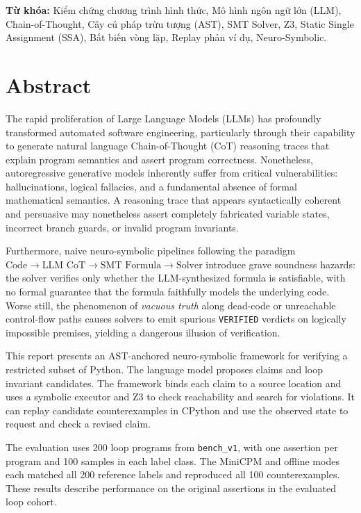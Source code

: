 \vspace{0.5cm}
\noindent\textbf{Từ khóa:} Kiểm chứng chương trình hình thức, Mô hình ngôn ngữ lớn (LLM), Chain-of-Thought, Cây cú pháp trừu tượng (AST), SMT Solver, Z3, Static Single Assignment (SSA), Bất biến vòng lặp, Replay phản ví dụ, Neuro-Symbolic.

\chapter*{Abstract}
The rapid proliferation of Large Language Models (LLMs) has profoundly transformed automated software engineering, particularly through their capability to generate natural language Chain-of-Thought (CoT) reasoning traces that explain program semantics and assert program correctness. Nonetheless, autoregressive generative models inherently suffer from critical vulnerabilities: hallucinations, logical fallacies, and a fundamental absence of formal mathematical semantics. A reasoning trace that appears syntactically coherent and persuasive may nonetheless assert completely fabricated variable states, incorrect branch guards, or invalid program invariants.

Furthermore, naive neuro-symbolic pipelines following the paradigm $\text{Code} \rightarrow \text{LLM CoT} \rightarrow \text{SMT Formula} \rightarrow \text{Solver}$ introduce grave soundness hazards: the solver verifies only whether the LLM-synthesized formula is satisfiable, with no formal guarantee that the formula faithfully models the underlying code. Worse still, the phenomenon of \textit{vacuous truth} along dead-code or unreachable control-flow paths causes solvers to emit spurious \texttt{VERIFIED} verdicts on logically impossible premises, yielding a dangerous illusion of verification.

This report presents an AST-anchored neuro-symbolic framework for verifying a restricted subset of Python. The language model proposes claims and loop invariant candidates. The framework binds each claim to a source location and uses a symbolic executor and Z3 to check reachability and search for violations. It can replay candidate counterexamples in CPython and use the observed state to request and check a revised claim.

The evaluation uses 200 loop programs from \texttt{bench\_v1}, with one assertion per program and 100 samples in each label class. The MiniCPM and offline modes each matched all 200 reference labels and reproduced all 100 counterexamples. These results describe performance on the original assertions in the evaluated loop cohort.

